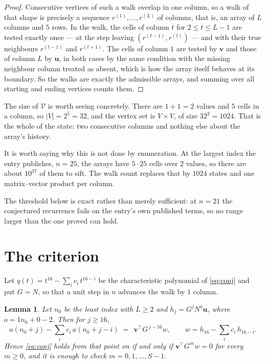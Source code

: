 \documentclass[11pt,a4paper]{article}
\theoremstyle{plain}
\newtheorem{lemma}[theorem]{Lemma}
\theoremstyle{definition}
\begin{document}
\begin{proof}
Consecutive vertices of such a walk overlap in one column, so a walk of that shape is
precisely a sequence $r^{(1)},\dots,r^{(L)}$ of columns, that is, an array of $L$ columns
and $5$ rows. In the walk, the cells of column $t$ for $2\le t\le L-1$ are tested
exactly once --- at the step leaving $(r^{(t-1)},r^{(t)})$ --- and with their true
neighbours $r^{(t-1)}$ and $r^{(t+1)}$. The cells of column $1$ are tested by
$\mathbf{v}$ and those of column $L$ by $\mathbf{u}$, in both cases by the same condition
with the missing neighbour column treated as absent, which is how the array itself behaves at
its boundary. So the walks are exactly the admissible arrays, and summing over all starting
and ending vertices counts them.
\end{proof}


The size of $\mathcal V$ is worth seeing concretely. There are $1+1=2$ values
and $5$ cells in a column, so $|V|=2^{5}=32$, and the vertex set is
$V\times V$, of size $32^2=1024$. That is the whole of the state: two consecutive
columns and nothing else about the array's history.

It is worth saying why this is not done by enumeration. At the largest index the entry
publishes, $n=25$, the arrays have $5\cdot25$ cells over
$2$ values, so there are about $10^{37}$ of them to sift. The
walk count replaces that by $1024$ states and one matrix--vector product per column.

The threshold below is exact rather than merely sufficient: at $n=21$ the conjectured
recurrence fails on the entry's own published terms, so no range larger than the one proved
can hold.
\section{The criterion}

Let $q(t)=t^{16}-\sum_i c_i\,t^{16-i}$ be the characteristic polynomial of
\eqref{eq:conj} and put $G=N$, so that a unit step in $n$ advances the walk by
$1$ column.

\begin{lemma}\label{lem:crit}
Let $n_0$ be the least index with $L\ge2$ and $h_j=G^{j}N^{o}\mathbf{u}$, where
$o=1n_0+0-2$. Then for $j\ge16$,
\[
a(n_0+j)-\sum_i c_i\,a(n_0+j-i)\;=\;\,\mathbf{v}^{\!\top}G^{\,j-16}w,
\qquad w=h_{16}-\sum_i c_i\,h_{16-i} .
\]
Hence \eqref{eq:conj} holds from that point on if and only if
$\mathbf{v}^{\!\top}G^{m}w=0$ for every $m\ge0$, and it is enough to check
$m=0,1,\dots,S-1$.
\end{lemma}
\end{document}
